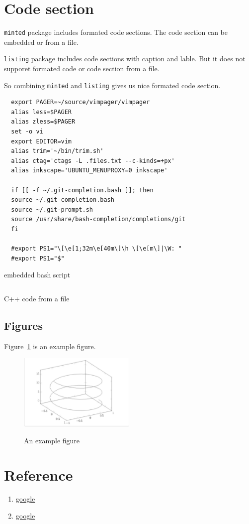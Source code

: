 \section{Code section}
\texttt{minted} package includes formated code sections. 
The code section can be embedded or from a file.

\texttt{listing} package includes code sections with caption and lable.
But it does not supporet formated code or code section from a file.

So combining \texttt{minted} and \texttt{listing} gives us nice formated code section.


\begin{listing}[!ht]
\begin{verbatim}
  export PAGER=~/source/vimpager/vimpager
  alias less=$PAGER
  alias zless=$PAGER
  set -o vi
  export EDITOR=vim
  alias trim='~/bin/trim.sh'
  alias ctag='ctags -L .files.txt --c-kinds=+px'
  alias inkscape='UBUNTU_MENUPROXY=0 inkscape'

  if [[ -f ~/.git-completion.bash ]]; then
  source ~/.git-completion.bash
  source ~/.git-prompt.sh
  source /usr/share/bash-completion/completions/git
  fi

  #export PS1="\[\e[1;32m\e[40m\]\h \[\e[m\]|\W: "
  #export PS1="$"
\end{verbatim}
\caption{embedded bash script}
\label{embedded_code_section}
\end{listing}

\begin{listing}[!ht]
\inputminted{cpp}{template/source/helloWorld.cpp}
\caption{C++ code from a file}
\label{file_code_section}
\end{listing}

\subsection{Figures}%
\label{sub:figures}

Figure~\ref{fig:Example} is an example figure.


\begin{figure}[h]
\caption{An example figure}
\centering
\includegraphics[width=0.5\textwidth]{./template/figure.pdf}
\label{fig:Example}
\end{figure}

\section{Reference}

\begin{enumerate}
  \item \href{https://www.google.com/}{google}
  \item \href{https://www.google.com/}{google}
\end{enumerate}
